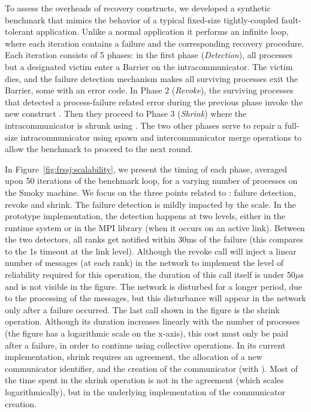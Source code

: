 To assess the overheads of recovery constructs, we developed a synthetic
benchmark that mimics the behavior of a typical fixed-size tightly-coupled
fault-tolerant application. Unlike a normal application it performs an infinite
loop, where each iteration contains a failure and the corresponding recovery
procedure. Each iteration consists of 5 phases: in the first phase
(\emph{Detection}), all processes but a designated victim enter a Barrier on the
intracommunicator. The victim dies, and the failure detection mechanism makes
all surviving processes exit the Barrier, some with an error code. In Phase 2
(\emph{Revoke}), the surviving processes that detected a process-failure related
error during the previous phase invoke the new construct
. Then they proceed to Phase 3 (\emph{Shrink}) where
the intracommunicator is shrunk using . The two
other phases serve to repair a full-size intracommunicator using 
spawn and intercommunicator merge operations to allow the
benchmark to proceed to the next round.

In Figure~\ref{fig:frssj:scalability}, we present the timing of each phase,
averaged upon 50 iterations of the benchmark loop, for a varying number of
processes on the Smoky machine. We focus on the three points related to \ulfm:
failure detection, revoke and shrink. The failure detection is mildly impacted by
the scale. In the prototype implementation, the detection happens at two levels,
either in the runtime system or in the MPI library (when it occurs on an active
link).
Between the two detectors, all ranks get notified within 30ms of the
failure (this compares to the 1s timeout at the link level). Although the revoke call will inject a linear number of messages (at
each rank) in the network to implement the level of reliability required for
this operation, the duration of this call itself is under 50$\mu$s and is not
visible in the figure. The network is disturbed for a longer period, due to the
processing of the messages, but this disturbance will appear in the network only
after a failure occurred.  The last call shown in the figure is the shrink
operation. Although its duration increases linearly with the number of processes
(the figure has a logarithmic scale on the x-axis), this cost must only be paid
after a failure, in order to continue using collective operations. In its
current implementation, shrink requires an agreement, the allocation of a new
communicator identifier, and the creation of the communicator (with
). Most of the time spent in the shrink operation is 
not in the agreement (which scales logarithmically), but in the underlying 
implementation of the communicator creation. 
